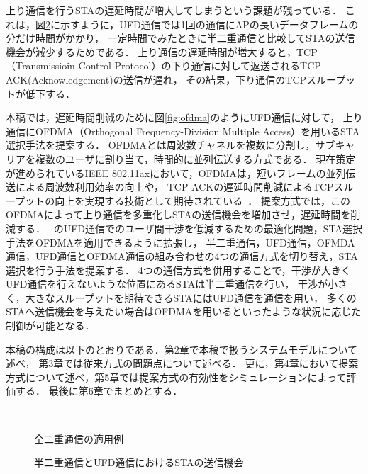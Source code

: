 \documentclass[technicalreport]{ieicej}
\begin{document}
	上り通信を行うSTAの遅延時間が増大してしまうという課題が残っている．
	これは，図\ref{fig:problem}に示すように，UFD通信では1回の通信にAPの長いデータフレームの分だけ時間がかかり，
	一定時間でみたときに半二重通信と比較してSTAの送信機会が減少するためである．
	上り通信の遅延時間が増大すると，TCP（Transmissioin Control Protocol）の下り通信に対して返送されるTCP-ACK(Acknowledgement)の送信が遅れ，
	その結果，下り通信のTCPスループットが低下する．
	\par
	本稿では，遅延時間削減のために図\ref{fig:ofdma}のようにUFD通信に対して，
	上り通信にOFDMA（Orthogonal Frequency-Division Multiple Access）を用いるSTA選択手法を提案する．
	OFDMAとは周波数チャネルを複数に分割し，サブキャリアを複数のユーザに割り当て，時間的に並列伝送する方式である．
	現在策定が進められているIEEE 802.11axにおいて，OFDMAは，短いフレームの並列伝送による周波数利用効率の向上や，
	TCP-ACKの遅延時間削減によるTCPスループットの向上を実現する技術として期待されている~\cite{ofdma}．
	提案方式では，このOFDMAによって上り通信を多重化しSTAの送信機会を増加させ，遅延時間を削減する．
	~\cite{promac_fair}のUFD通信でのユーザ間干渉を低減するための最適化問題，STA選択手法をOFDMAを適用できるように拡張し，
	半二重通信，UFD通信，OFMDA通信，UFD通信とOFDMA通信の組み合わせの4つの通信方式を切り替え，STA選択を行う手法を提案する．
	4つの通信方式を併用することで，干渉が大きくUFD通信を行えないような位置にあるSTAは半二重通信を行い，
	干渉が小さく，大きなスループットを期待できるSTAにはUFD通信を通信を用い，
	多くのSTAへ送信機会を与えたい場合はOFDMAを用いるといったような状況に応じた制御が可能となる．
	\par
	本稿の構成は以下のとおりである．第2章で本稿で扱うシステムモデルについて述べ，
	第3章では従来方式の問題点について述べる．
	更に，第4章において提案方式について述べ，第5章では提案方式の有効性をシミュレーションによって評価する．
	最後に第6章でまとめとする．

	\begin{figure}[t]
		\centering
		\\
		\caption{全二重通信の適用例}
		\label{fig:topology}
	\end{figure}

	\begin{figure}[t]
		\centering
		\caption{半二重通信とUFD通信におけるSTAの送信機会}
		\label{fig:problem}
	\end{figure}
\end{document}
